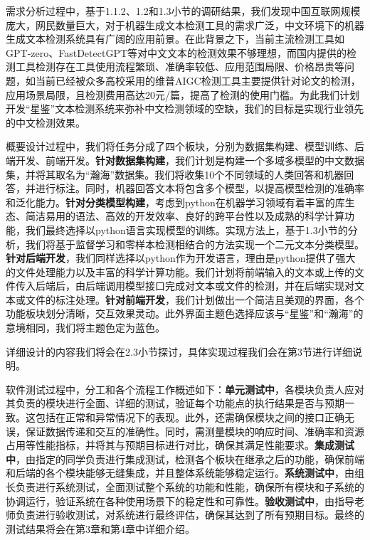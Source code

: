 \documentclass[a4paper]{report}
\begin{document}
需求分析过程中，基于1.1.2、1.2和1.3小节的调研结果，我们发现中国互联网规模庞大，网民数量巨大，对于机器生成文本检测工具的需求广泛，中文环境下的机器生成文本检测系统具有广阔的应用前景。在此背景之下，当前主流检测工具如GPT-zero、FastDetectGPT等对中文文本的检测效果不够理想，而国内提供的检测工具检测存在工具使用流程繁琐、准确率较低、应用范围局限、价格昂贵等问题，如当前已经被众多高校采用的维普AIGC检测工具主要提供针对论文的检测，应用场景局限，且检测费用高达20元/篇，提高了检测的使用门槛。为此我们计划开发“星鉴”文本检测系统来弥补中文检测领域的空缺，我们的目标是实现行业领先的中文检测效果。

概要设计过程中，我们将任务分成了四个板块，分别为数据集构建、模型训练、后端开发、前端开发。\textbf{针对数据集构建}，我们计划是构建一个多域多模型的中文数据集，并将其取名为“瀚海”数据集。我们将收集10个不同领域的人类回答和机器回答，并进行标注。同时，机器回答文本将包含多个模型，以提高模型检测的准确率和泛化能力。\textbf{针对分类模型构建}，考虑到python在机器学习领域有着丰富的库生态、简洁易用的语法、高效的开发效率、良好的跨平台性以及成熟的科学计算功能，我们最终选择以python语言实现模型的训练。实现方法上，基于1.3小节的分析，我们将基于监督学习和零样本检测相结合的方法实现一个二元文本分类模型。\textbf{针对后端开发}，我们同样选择以python作为开发语言，理由是python提供了强大的文件处理能力以及丰富的科学计算功能。我们计划将前端输入的文本或上传的文件传入后端后，由后端调用模型接口完成对文本或文件的检测，并在后端实现对文本或文件的标注处理。\textbf{针对前端开发}，我们计划做出一个简洁且美观的界面，各个功能板块划分清晰，交互效果灵动。此外界面主题色选择应该与“星鉴”和“瀚海”的意境相同，我们将主题色定为蓝色。%

详细设计的内容我们将会在2.3小节探讨，具体实现过程我们会在第3节进行详细说明。

软件测试过程中，分工和各个流程工作概述如下：\textbf{单元测试中}，各模块负责人应对其负责的模块进行全面、详细的测试，验证每个功能点的执行结果是否与预期一致。这包括在正常和异常情况下的表现。此外，还需确保模块之间的接口正确无误，保证数据传递和交互的准确性。同时，需测量模块的响应时间、准确率和资源占用等性能指标，并将其与预期目标进行对比，确保其满足性能要求。\textbf{集成测试中}，由指定的同学负责进行集成测试，检测各个板块在继承之后的功能，确保前端和后端的各个模块能够无缝集成，并且整体系统能够稳定运行。\textbf{系统测试中}，由组长负责进行系统测试，全面测试整个系统的功能和性能，确保所有模块和子系统的协调运行，验证系统在各种使用场景下的稳定性和可靠性。\textbf{验收测试中}，由指导老师负责进行验收测试，对系统进行最终评估，确保其达到了所有预期目标。最终的测试结果将会在第3章和第4章中详细介绍。
\end{document}
